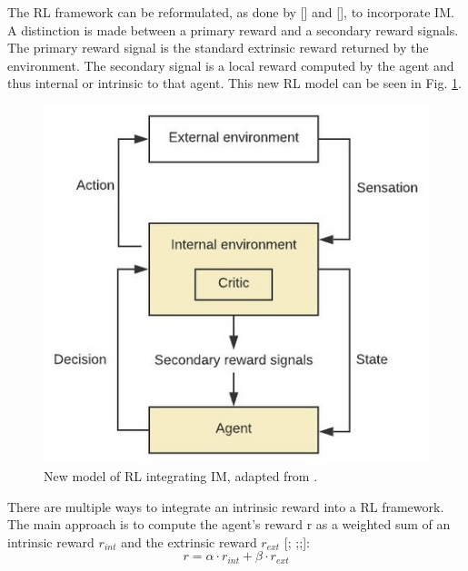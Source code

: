 \documentclass[conference]{IEEEtran}
\begin{document}
The RL framework can be reformulated, as done by [\cite{singh2010intrinsically}] and [\cite{barto2004intrinsically}], to incorporate IM. A distinction is made between a primary reward and a secondary reward signals. The primary reward signal is the standard extrinsic reward returned by the environment. The secondary signal is a local reward computed by the agent and thus internal or intrinsic to that agent. This new RL model can be seen in  Fig. \ref{fig:new_rl_model}.
\begin{figure}[h]
\centering
\includegraphics[width=0.9\columnwidth]{img/New-model-of-RL-integrating-IM-adapted-from-Singh-et-al-2010_W640.jpg}
\caption{New model of RL integrating IM, adapted from \cite{singh2010intrinsically}.}
\label{fig:new_rl_model}
\end{figure}

There are multiple ways to integrate an intrinsic reward into a RL framework. The main approach is to compute the agent’s reward r as a weighted sum
of an intrinsic reward $r_{int}$ and the extrinsic reward $r_{ext}$ [\cite{burda2018exploration}; \cite{gregor2016variational};\cite{vezhnevets2017feudal};\cite{huang2019learning}]:
\begin{equation*}
r = \alpha \cdot r_{int} + \beta \cdot r_{ext}
\end{equation*}
\end{document}
